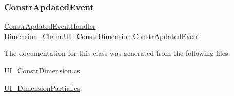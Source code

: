 \subsubsection{\texorpdfstring{Constr\+Apdated\+Event}{ConstrApdatedEvent}}
{\footnotesize\ttfamily \mbox{\hyperlink{class_dimension___chain_1_1_u_i___constr_dimension_afb6b60fe4836094dcbf61d6347f94b24}{Constr\+Apdated\+Event\+Handler}} Dimension\+\_\+\+Chain.\+U\+I\+\_\+\+Constr\+Dimension.\+Constr\+Apdated\+Event}



The documentation for this class was generated from the following files\+:\begin{DoxyCompactItemize}
\item 
\mbox{\hyperlink{_u_i___constr_dimension_8cs}{U\+I\+\_\+\+Constr\+Dimension.\+cs}}\item 
\mbox{\hyperlink{_u_i___dimension_partial_8cs}{U\+I\+\_\+\+Dimension\+Partial.\+cs}}\end{DoxyCompactItemize}
